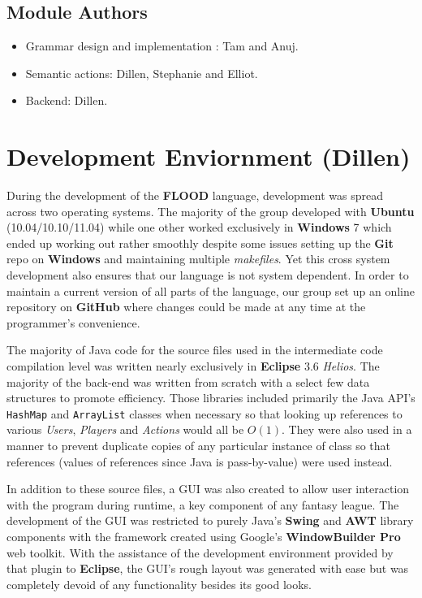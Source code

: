 \documentclass[12pt]{report}
\begin{document}
\section{Module Authors}
\begin{singlespace}
\begin{itemize}
\item Grammar design and implementation : Tam and Anuj.
\item Semantic actions: Dillen, Stephanie and Elliot.
\item Backend: Dillen.
\end{itemize}
\end{singlespace}

\chapter{Development Enviornment (Dillen)}

During the development of the \textbf{FLOOD} language, development was spread across two operating systems. The majority of the group developed with \textbf{Ubuntu} (10.04/10.10/11.04) while one other worked exclusively in \textbf{Windows} 7 which ended up working out rather smoothly despite some issues setting up the \textbf{Git} repo on \textbf{Windows} and maintaining multiple \textit{makefiles}. Yet this cross system development also ensures that our language is not system dependent. In order to maintain a current version of all parts of the language, our group set up an online repository on \textbf{GitHub} where changes could be made at any time at the programmer's convenience.

The majority of Java code for the source files used in the intermediate code compilation level was written nearly exclusively in \textbf{Eclipse} 3.6 \textit{Helios}. The majority of the back-end was written from scratch with a select few data structures to promote efficiency. Those libraries included primarily the Java API's \texttt{HashMap} and \texttt{ArrayList} classes when necessary so that looking up references to various \textit{Users}, \textit{Players} and \textit{Actions} would all be $O(1)$. They were also used in a manner to prevent duplicate copies of any particular instance of class so that references (values of references since Java is pass-by-value) were used instead.

In addition to these source files, a GUI was also created to allow user interaction with the program during runtime, a key component of any fantasy league. The development of the GUI was restricted to purely Java's \textbf{Swing} and \textbf{AWT} library components with the framework created using Google's \textbf{WindowBuilder Pro} web toolkit. With the assistance of the development environment provided by that plugin to \textbf{Eclipse}, the GUI's rough layout was generated with ease but was completely devoid of any functionality besides its good looks.
\end{document}
